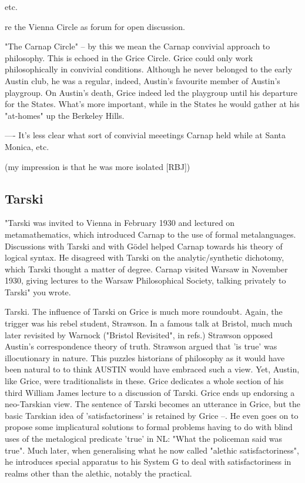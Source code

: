 \documentclass[10pt,titlepage]{book}
\begin{document}
{etc. 
 
re the Vienna Circle as forum for open discussion.
 
"The Carnap Circle" -- by this we mean the Carnap convivial approach to  
philosophy. This is echoed in the Grice Circle. Grice could only work  
philosophically in convivial conditions. Although he never belonged to the early  
Austin club, he was a regular, indeed, Austin's favourite member of Austin's  
playgroup. On Austin's death, Grice indeed led the playgroup until his 
departure  for the States. What's more important, while in the States he would 
gather at  his "at-homes" up the Berkeley Hills.
 
---- It's less clear what sort of convivial meeetings Carnap held while at  
Santa Monica, etc.

(my impression is that he was more isolated [RBJ])

\subsection{Tarski}

"Tarski was invited to Vienna in February 1930 and lectured on  
metamathematics, which introduced Carnap to the use of formal metalanguages.  
Discussions with Tarski and with Gödel helped Carnap towards his theory of  logical 
syntax. He disagreed with Tarski on the analytic/synthetic dichotomy,  which 
Tarski thought a matter of degree. Carnap visited Warsaw in November 1930,  
giving lectures to the Warsaw Philosophical Society, talking privately to  
Tarski" you wrote.
  
Tarski. The influence of Tarski on Grice is much more roundoubt. Again, the 
 trigger was his rebel student, Strawson. In a famous talk at Bristol,  
much much later revisited by Warnock ("Bristol Revisited", in refs.) Strawson  
opposed Austin's correspondence theory of truth. Strawson argued that 'is  
true' was illocutionary in nature. This puzzles historians of philosophy as 
it  would have been natural to to think AUSTIN would have embraced such a 
view.  Yet, Austin, like Grice, were traditionalists in these. Grice dedicates 
a  whole section of his third William James lecture to a discussion of 
Tarski.  Grice ends up endorsing a neo-Tarskian view. The sentence of Tarski 
becomes an  utterance in Grice, but the basic Tarskian idea of 
'satisfactoriness' is  retained by Grice --. He even goes on to propose some implicatural 
solutions to  formal problems having to do with blind uses of the metalogical 
predicate  'true' in NL: "What the policeman said was true". Much later, when 
 generalising what he now called "alethic satisfactoriness", he introduces  
special apparatus to his System G to deal with satisfactoriness in realms 
other  than the alethic, notably the practical. 
 
}
\end{document}
